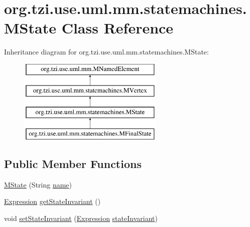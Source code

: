 \hypertarget{classorg_1_1tzi_1_1use_1_1uml_1_1mm_1_1statemachines_1_1_m_state}{\section{org.\-tzi.\-use.\-uml.\-mm.\-statemachines.\-M\-State Class Reference}
\label{classorg_1_1tzi_1_1use_1_1uml_1_1mm_1_1statemachines_1_1_m_state}
}
Inheritance diagram for org.\-tzi.\-use.\-uml.\-mm.\-statemachines.\-M\-State\-:\begin{figure}[H]
\begin{center}
\leavevmode
\includegraphics[height=4.000000cm]{classorg_1_1tzi_1_1use_1_1uml_1_1mm_1_1statemachines_1_1_m_state}
\end{center}
\end{figure}
\subsection*{Public Member Functions}
\begin{DoxyCompactItemize}
\item 
\hyperlink{classorg_1_1tzi_1_1use_1_1uml_1_1mm_1_1statemachines_1_1_m_state_afdc1254f374449a9c9275c71f4584ed4}{M\-State} (String \hyperlink{classorg_1_1tzi_1_1use_1_1uml_1_1mm_1_1statemachines_1_1_m_vertex_a9bb884a76140732039ff1fbf631b6575}{name})
\item 
\hyperlink{classorg_1_1tzi_1_1use_1_1uml_1_1ocl_1_1expr_1_1_expression}{Expression} \hyperlink{classorg_1_1tzi_1_1use_1_1uml_1_1mm_1_1statemachines_1_1_m_state_a5795c839915a54aa770086bb18a3c60d}{get\-State\-Invariant} ()
\item 
void \hyperlink{classorg_1_1tzi_1_1use_1_1uml_1_1mm_1_1statemachines_1_1_m_state_a05c9e15e1f05af9a7fb44f46f3076774}{set\-State\-Invariant} (\hyperlink{classorg_1_1tzi_1_1use_1_1uml_1_1ocl_1_1expr_1_1_expression}{Expression} \hyperlink{classorg_1_1tzi_1_1use_1_1uml_1_1mm_1_1statemachines_1_1_m_state_a775770f5d4a9f30a5cf59a77f11aa5d6}{state\-Invariant})
\end{DoxyCompactItemize}
